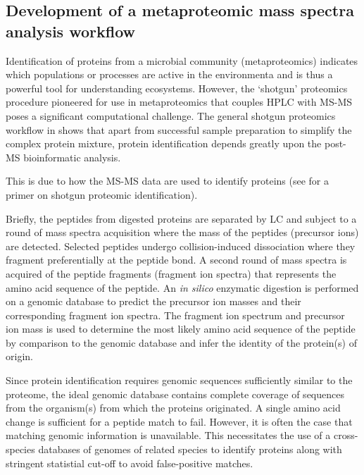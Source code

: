 
\subsection[Development of a metaproteomic mass spectra analysis workflow ]{Development of a metaproteomic mass spectra analysis workflow }

Identification of proteins from a microbial community (metaproteomics) indicates which populations or processes are active in the environmenta and is thus a powerful tool for understanding ecosystems.
However, the `shotgun' proteomics procedure pioneered for use in metaproteomics that couples \ac{HPLC} with \ac{MS-MS} \cite{Ram2005} poses a significant computational challenge.
The general shotgun proteomics workflow in  shows that apart from successful sample preparation to simplify the complex protein mixture, protein identification depends greatly upon the post-\ac{MS} bioinformatic analysis.

This is due to how the \ac{MS-MS} data are used to identify proteins (see \citet{Marcotte2007} for a primer on shotgun proteomic identification).

Briefly, the peptides from digested proteins are separated by \ac{LC} and subject to a round of mass spectra acquisition where the mass of the peptides (precursor ions) are detected.
Selected peptides undergo collision-induced dissociation where they fragment preferentially at the peptide bond.
A second round of mass spectra is acquired of the peptide fragments (fragment ion spectra) that represents the amino acid sequence of the peptide.
An \emph{in silico} enzymatic digestion is performed on a genomic database to predict the precursor ion masses and their corresponding fragment ion spectra.
The fragment ion spectrum and precursor ion mass is used to determine the most likely amino acid sequence of the peptide by comparison to the genomic database and infer the identity of the protein(s) of origin.

Since protein identification requires genomic sequences sufficiently similar to the proteome, the ideal genomic database contains complete coverage of sequences from the organism(s) from which the proteins originated. 
A single amino acid change is sufficient for a peptide match to fail.
However, it is often the case that matching genomic information is unavailable. 
This necessitates the use of a cross-species databases of genomes of related species to identify proteins along with stringent statistial cut-off to avoid false-positive matches.


